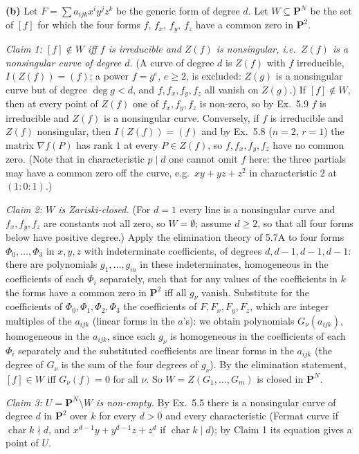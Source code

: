 \documentclass[11pt]{article}
\begin{document}
\textbf{(b)} Let $F=\sum a_{ijk}x^iy^jz^k$ be the generic form of degree $d$. Let $W\subseteq\mathbf P^N$ be the set of $[f]$ for which the four forms $f,\,f_x,\,f_y,\,f_z$ have a common zero in $\mathbf P^2$.

\emph{Claim 1: $[f]\notin W$ iff $f$ is irreducible and $Z(f)$ is nonsingular, i.e.\ $Z(f)$ is a nonsingular curve of degree $d$.} (A curve of degree $d$ is $Z(f)$ with $f$ irreducible, $I(Z(f))=(f)$; a power $f=g^e$, $e\ge2$, is excluded: $Z(g)$ is a nonsingular curve but of degree $\deg g<d$, and $f,f_x,f_y,f_z$ all vanish on $Z(g)$.) If $[f]\notin W$, then at every point of $Z(f)$ one of $f_x,f_y,f_z$ is non-zero, so by Ex.~5.9 $f$ is irreducible and $Z(f)$ is a nonsingular curve. Conversely, if $f$ is irreducible and $Z(f)$ nonsingular, then $I(Z(f))=(f)$ and by Ex.~5.8 ($n=2$, $r=1$) the matrix $\nabla f(P)$ has rank $1$ at every $P\in Z(f)$, so $f,f_x,f_y,f_z$ have no common zero. (Note that in characteristic $p\mid d$ one cannot omit $f$ here: the three partials may have a common zero off the curve, e.g.\ $xy+yz+z^2$ in characteristic $2$ at $(1:0:1)$.)

\emph{Claim 2: $W$ is Zariski-closed.} (For $d=1$ every line is a nonsingular curve and $f_x,f_y,f_z$ are constants not all zero, so $W=\emptyset$; assume $d\ge2$, so that all four forms below have positive degree.) Apply the elimination theory of 5.7A to four forms $\Phi_0,\dots,\Phi_3$ in $x,y,z$ with indeterminate coefficients, of degrees $d,d-1,d-1,d-1$: there are polynomials $g_1,\dots,g_m$ in these indeterminates, homogeneous in the coefficients of each $\Phi_i$ separately, such that for any values of the coefficients in $k$ the forms have a common zero in $\mathbf P^2$ iff all $g_\nu$ vanish. Substitute for the coefficients of $\Phi_0,\Phi_1,\Phi_2,\Phi_3$ the coefficients of $F,F_x,F_y,F_z$, which are integer multiples of the $a_{ijk}$ (linear forms in the $a$'s): we obtain polynomials $G_\nu(a_{ijk})$, homogeneous in the $a_{ijk}$, since each $g_\nu$ is homogeneous in the coefficients of each $\Phi_i$ separately and the substituted coefficients are linear forms in the $a_{ijk}$ (the degree of $G_\nu$ is the sum of the four degrees of $g_\nu$). By the elimination statement, $[f]\in W$ iff $G_\nu(f)=0$ for all $\nu$. So $W=Z(G_1,\dots,G_m)$ is closed in $\mathbf P^N$.

\emph{Claim 3: $U=\mathbf P^N\setminus W$ is non-empty.} By Ex.~5.5 there is a nonsingular curve of degree $d$ in $\mathbf P^2$ over $k$ for every $d>0$ and every characteristic (Fermat curve if $\operatorname{char}k\nmid d$, and $x^{d-1}y+y^{d-1}z+z^d$ if $\operatorname{char}k\mid d$); by Claim 1 its equation gives a point of $U$.
\end{document}
